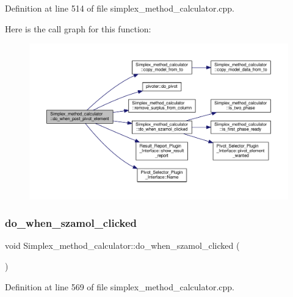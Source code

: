 Definition at line 514 of file simplex\+\_\+method\+\_\+calculator.\+cpp.

Here is the call graph for this function\+:\nopagebreak
\begin{figure}[H]
\begin{center}
\leavevmode
\includegraphics[width=350pt]{classSimplex__method__calculator_aea11e77d951c1d5f5e09d366d0d0a556_cgraph}
\end{center}
\end{figure}
\mbox{\label{classSimplex__method__calculator_aac8e0f77b94815c04834b226637b0d6a}} 
\subsubsection{\texorpdfstring{do\+\_\+when\+\_\+szamol\+\_\+clicked}{do\_when\_szamol\_clicked}}
{\footnotesize\ttfamily void Simplex\+\_\+method\+\_\+calculator\+::do\+\_\+when\+\_\+szamol\+\_\+clicked (\begin{DoxyParamCaption}{ }\end{DoxyParamCaption})\hspace{0.3cm}{\ttfamily [slot]}}



Definition at line 569 of file simplex\+\_\+method\+\_\+calculator.\+cpp.

